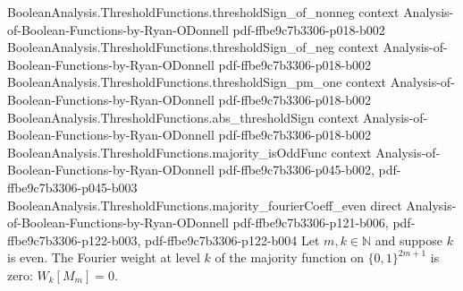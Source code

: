 \begin{lemma}
  {BooleanAnalysis.ThresholdFunctions.thresholdSign_of_nonneg}
  {context}
  {Analysis-of-Boolean-Functions-by-Ryan-ODonnell}
  {pdf-ffbe9c7b3306-p018-b002}
\proofstep
  {BooleanAnalysis.ThresholdFunctions.thresholdSign_of_neg}
  {context}
  {Analysis-of-Boolean-Functions-by-Ryan-ODonnell}
  {pdf-ffbe9c7b3306-p018-b002}
\proofstep
  {BooleanAnalysis.ThresholdFunctions.thresholdSign_pm_one}
  {context}
  {Analysis-of-Boolean-Functions-by-Ryan-ODonnell}
  {pdf-ffbe9c7b3306-p018-b002}
\proofstep
  {BooleanAnalysis.ThresholdFunctions.abs_thresholdSign}
  {context}
  {Analysis-of-Boolean-Functions-by-Ryan-ODonnell}
  {pdf-ffbe9c7b3306-p018-b002}
\proofstep
  {BooleanAnalysis.ThresholdFunctions.majority_isOddFunc}
  {context}
  {Analysis-of-Boolean-Functions-by-Ryan-ODonnell}
  {pdf-ffbe9c7b3306-p045-b002,
    pdf-ffbe9c7b3306-p045-b003}
\proofstep
  {BooleanAnalysis.ThresholdFunctions.majority_fourierCoeff_even}
  {direct}
  {Analysis-of-Boolean-Functions-by-Ryan-ODonnell}
  {pdf-ffbe9c7b3306-p121-b006,
    pdf-ffbe9c7b3306-p122-b003,
    pdf-ffbe9c7b3306-p122-b004}
Let $m,k\in\mathbb N$ and suppose $k$ is even. The Fourier weight at level $k$ of the
majority function on $\{0,1\}^{2m+1}$ is zero: $W_k[M_m]=0$.
\end{lemma}

